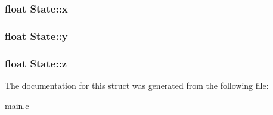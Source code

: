 \subsubsection[{\texorpdfstring{x}{x}}]{\setlength{\rightskip}{0pt plus 5cm}float State\+::x}\hypertarget{structState_a9948cc668f49246582cfd131b7928f7e}{}\label{structState_a9948cc668f49246582cfd131b7928f7e}
\subsubsection[{\texorpdfstring{y}{y}}]{\setlength{\rightskip}{0pt plus 5cm}float State\+::y}\hypertarget{structState_a89572abb38dea3b1a780ede589a2d59b}{}\label{structState_a89572abb38dea3b1a780ede589a2d59b}
\subsubsection[{\texorpdfstring{z}{z}}]{\setlength{\rightskip}{0pt plus 5cm}float State\+::z}\hypertarget{structState_aed6ded85740f752ec9c5c2ca499da5a9}{}\label{structState_aed6ded85740f752ec9c5c2ca499da5a9}


The documentation for this struct was generated from the following file\+:\begin{DoxyCompactItemize}
\item 
\hyperlink{main_8c}{main.\+c}\end{DoxyCompactItemize}
